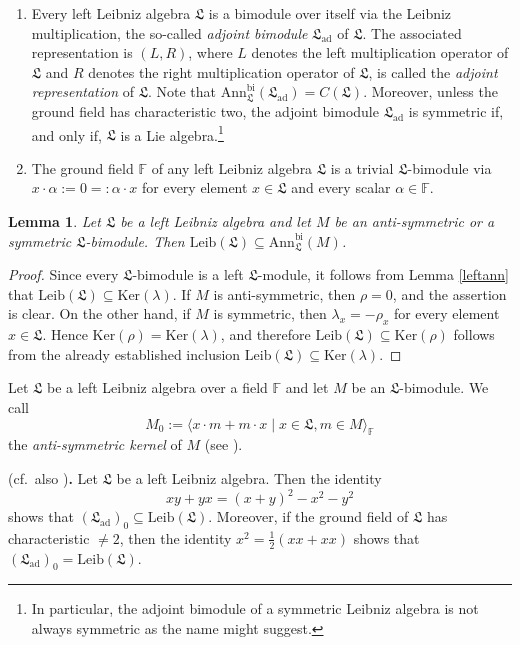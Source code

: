 \documentclass{amsart}
\newtheorem{lem}[thm]{Lemma}
\numberwithin{equation}{section}
\newcommand{\ad}{\mathrm{ad}}
\newcommand{\leib}{\mathrm{Leib}}
\newcommand{\bi}{\mathrm{bi}}
\newcommand{\Ker}{\mathrm{Ker}}
\newcommand{\ann}{\mathrm{Ann}}
\newcommand{\F}{\mathbb{F}}
\newcommand{\lf}{\mathfrak{L}}
\begin{document}
\begin{enumerate}
\item[(1)] Every left Leibniz algebra $\lf$ is a bimodule over itself via the Leibniz multiplication,
                the so-called {\em adjoint bimodule\/} $\lf_\ad$ of $\lf$. The associated representation
                is $(L,R)$, where $L$ denotes the left multiplication operator of $\lf$ and $R$ denotes
                the right multiplication operator of $\lf$, is called the {\em adjoint representation\/} of
                $\lf$. Note that $\ann_\lf^\bi(\lf_\ad)=C(\lf)$. Moreover, unless the ground field has
                characteristic two, the adjoint bimodule $\lf_\ad$ is symmetric if, and only if, $\lf$ is a Lie
                algebra.\footnote{In particular, the adjoint bimodule of a symmetric Leibniz algebra is not
                always symmetric as the name might suggest.}
\item[(2)] The ground field $\F$ of any left Leibniz algebra $\lf$ is a trivial $\lf$-bimodule via
                $x\cdot\alpha:=0=:\alpha\cdot x$ for every element $x\in\lf$ and every scalar
                $\alpha\in\F$.
\end{enumerate}
\vspace{.1cm}

\begin{lem}\label{ann}
Let $\lf$ be a left Leibniz algebra and let $M$ be an anti-symmetric or a symmetric $\lf$-bimodule.
Then $\leib(\lf)\subseteq\ann_\lf^\bi(M)$. 
\end{lem}

\begin{proof}
Since every $\lf$-bimodule is a left $\lf$-module, it follows from Lemma \ref{leftann} that $\leib(\lf)
\subseteq\Ker(\lambda)$. If $M$ is anti-symmetric, then $\rho=0$, and the assertion is clear.
On the other hand, if $M$ is symmetric, then $\lambda_x=-\rho_x$ for every element $x\in\lf$.
Hence $\Ker(\rho)=\Ker(\lambda)$, and therefore $\leib(\lf)\subseteq\Ker(\rho)$ follows from
the already established inclusion $\leib(\lf)\subseteq\Ker(\lambda)$.
\end{proof}

Let $\lf$ be a left Leibniz algebra over a field $\F$ and let $M$ be an $\lf$-bimodule. We call $$M_0
:=\langle x\cdot m+m\cdot x\mid x\in\lf,m\in M\rangle_\F$$ the {\em anti-symmetric kernel\/} of $M$
(see \cite[p.~145]{LP1}).
\vspace{.2cm}

 (cf.\ also \cite[p.\ 479]{FM}){\bf .}
Let $\lf$ be a left Leibniz algebra. Then the identity $$xy+yx=(x+y)^2-x^2-y^2$$ shows that
$(\lf_\ad)_0\subseteq\leib(\lf)$. Moreover, if the ground field of $\lf$ has characteristic $\ne 2$,
then the identity $x^2=\frac{1}{2}(xx+xx)$ shows that $(\lf_\ad)_0=\leib(\lf)$.
\vspace{.2cm}
\end{document}
